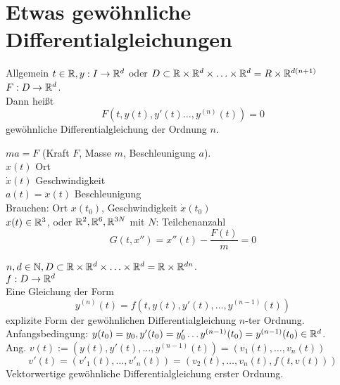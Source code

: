 \documentclass[../ana2.tex]{subfiles}
\begin{document}
\setcounter{section}{19}
\section{Etwas gewöhnliche Differentialgleichungen}
Allgemein \( t \in \mathbb{R}, y:I\rightarrow \mathbb{R}^d \) oder 
\( D \subset \mathbb{R} \times \mathbb{R}^d \times \ldots \times \mathbb{R}^d = R \times \mathbb{R}^{d(n+1)} \)
\( F:D\rightarrow \mathbb{R}^d \).\\
Dann heißt 
\[ F(t, y(t), y'(t) \ldots, y^{(n)}(t)) = 0 \]
gewöhnliche Differentialgleichung der Ordnung \(n\).
\begin{bsp}[Newton]
    \( m a = F \) (Kraft \(F\), Masse \(m\), Beschleunigung \(a\)).\\
    \( x(t) \) Ort\\
    \( \dot{x}(t) \) Geschwindigkeit \\
    \( a(t) = \ddot{x}(t) \) Beschleunigung\\
    Brauchen: Ort \(x(t_0)\), Geschwindigkeit \( \dot{x}(t_0) \)\\
    \( x(t) \in \mathbb{R}^3\), oder \( \mathbb{R}^2, \mathbb{R}^6, \mathbb{R}^{3N} \) mit \(N\): Teilchenanzahl
    \[G(t, x'') = x''(t) - \frac{F(t)}{m} = 0 \]
\end{bsp}
\begin{defi}
    \(n, d \in \mathbb{N}, D \subset \mathbb{R} \times \mathbb{R}^d \times \ldots \times \mathbb{R}^d = \mathbb{R} \times \mathbb{R}^{dn}\).\\
    \(f:D\rightarrow \mathbb{R}^d\)\\
    Eine Gleichung der Form 
    \[ y^{(n)}(t) = f(t, y(t), y'(t), \ldots, y^{(n-1)}(t)) \]
    explizite Form der gewöhnlichen Differentialgleichung \(n\)-ter Ordnung.\\
    Anfangsbedingung: \( y(t_0) = y_0, y'(t_0) = y'_0 
    \ldots y^{(n-1)}(t_0) = y^{(n-1)}(t_0) \in \mathbb{R}^d \).\\
    Ang. \( v(t) := (y(t), y'(t), \ldots, y^{(n-1)}(t)) = (v_1(t), \ldots, v_n(t)) \)\\
    \[ v'(t) = (v'_1(t), \ldots, v'_n(t)) 
    = (v_2(t), \ldots, v_n(t), f(t,v(t))) \]
    Vektorwertige gewöhnliche Differentialgleichung erster Ordnung.\\
\end{defi}
\end{document}
